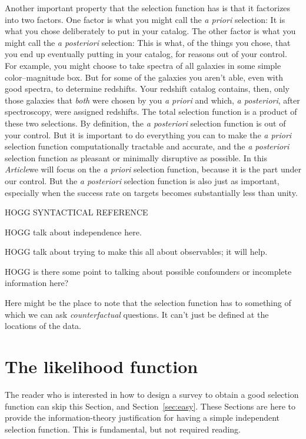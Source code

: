 \documentclass[modern]{aastex62}
\newcommand{\documentname}{\textsl{Article}}
\newcommand{\sectionname}{Section}
\newcommand{\foreign}[1]{\textsl{#1}}
\begin{document}
Another important property that the selection function has is that it
factorizes into two factors.
One factor is what you might call the \foreign{a priori} selection:
It is what you chose deliberately to put in your catalog.
The other factor is what you might call the \foreign{a posteriori}
selection:
This is what, of the things you chose, that you end up eventually
putting in your catalog, for reasons out of your control.
For example, you might choose to take spectra of all galaxies in some
simple color--magnitude box.
But for some of the galaxies you aren't able, even with good spectra,
to determine redshifts.
Your redshift catalog contains, then, only those galaxies that
\emph{both} were chosen by you \foreign{a priori} and which,
\foreign{a posteriori}, after spectroscopy, were assigned redshifts.
The total selection function is a product of these two selections.
By definition, the \foreign{a posteriori} selection function is out of
your control.
But it is important to do everything you can to make the \foreign{a
  priori} selection function computationally tractable and accurate,
and the \foreign{a posteriori} selection function as pleasant or
minimally disruptive as possible.
In this \documentname we will focus on the \foreign{a priori}
selection function, because it is the part under our control.
But the \foreign{a posteriori} selection function is also just as
important, especially when the success rate on targets becomes
substantially less than unity.

HOGG SYNTACTICAL REFERENCE

HOGG talk about independence here.

HOGG talk about trying to make this all about observables; it will help.

HOGG is there some point to talking about possible confounders or incomplete information here?

Here might be the place to note that the selection function has to something of
which we can ask \emph{counterfactual} questions. It can't just be defined at
the locations of the data.

\section{The likelihood function}\label{sec:lf}

The reader who is interested in how to design a survey to obtain a
good selection function can skip this \sectionname, and
\sectionname~\ref{sec:easy}.
These \sectionname s are here to provide the information-theory
justification for having a simple independent selection function.
This is fundamental, but not required reading.
\end{document}
